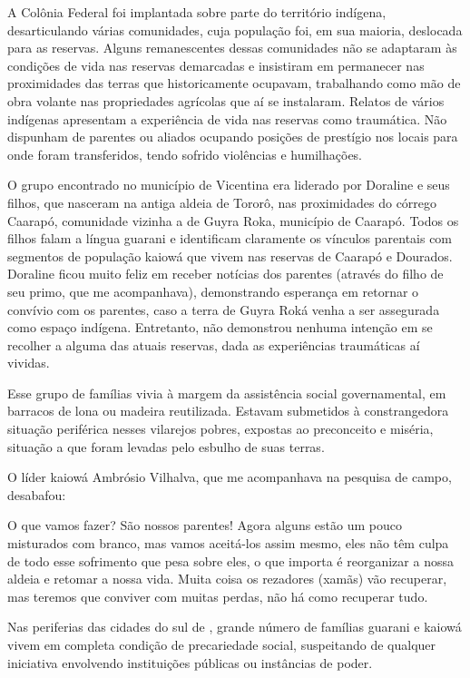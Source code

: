 A Colônia Federal foi implantada sobre parte do território indígena,
desarticulando várias comunidades, cuja população foi, em sua maioria,
deslocada para as reservas. Alguns remanescentes dessas comunidades não
se adaptaram às condições de vida nas reservas demarcadas e insistiram
em permanecer nas proximidades das terras que historicamente ocupavam,
trabalhando como mão de obra volante nas propriedades agrícolas que aí
se instalaram. Relatos de vários indígenas apresentam a experiência de
vida nas reservas como traumática. Não dispunham de parentes ou aliados
ocupando posições de prestígio nos locais para onde foram transferidos,
tendo sofrido violências e humilhações.

O grupo encontrado no município de Vicentina era liderado por Doraline e
seus filhos, que nasceram na antiga aldeia de Tororô, nas proximidades
do córrego Caarapó, comunidade vizinha a de Guyra Roka, município de
Caarapó. Todos os filhos falam a língua guarani e identificam
claramente os vínculos parentais com segmentos de população kaiowá que
vivem nas reservas de Caarapó e Dourados. Doraline ficou muito feliz em
receber notícias dos parentes (através do filho de seu primo, que me
acompanhava), demonstrando esperança em retornar o convívio com os
parentes, caso a terra de Guyra Roká venha a ser assegurada como espaço
indígena. Entretanto, não demonstrou nenhuma intenção em se recolher a
alguma das atuais reservas, dada as experiências traumáticas aí
vividas.

Esse grupo de famílias vivia à margem da assistência social
governamental, em barracos de lona ou madeira reutilizada. Estavam
submetidos à constrangedora situação periférica nesses vilarejos
pobres, expostas ao preconceito e miséria, situação a que foram levadas
pelo esbulho de suas terras.

O líder kaiowá Ambrósio Vilhalva, que me acompanhava na pesquisa de
campo, desabafou:

O que vamos fazer? São nossos parentes! Agora alguns estão um pouco
misturados com branco, mas vamos aceitá-los assim mesmo, eles não têm
culpa de todo esse sofrimento que pesa sobre eles, o que importa é
reorganizar a nossa aldeia e retomar a nossa vida. Muita coisa os
rezadores (xamãs) vão recuperar, mas teremos que conviver com muitas
perdas, não há como recuperar tudo.

Nas periferias das cidades do sul de , grande número de famílias
guarani e kaiowá vivem em completa condição de precariedade social,
suspeitando de qualquer iniciativa envolvendo instituições públicas ou
instâncias de poder. 

